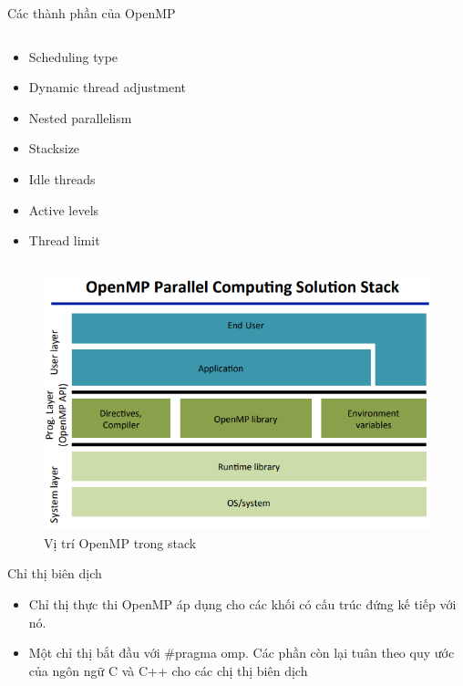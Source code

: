 \documentclass[10pt]{beamer}
\theoremstyle{remark}
\numberwithin{algocf}{section}
\numberwithin{equation}{section}
\numberwithin{dl}{section}
\numberwithin{figure}{section}
\begin{document}
\begin{frame}{Các thành phần của OpenMP}
\begin{columns}[onlytextwidth]
\begin{column}{0.3\textwidth}
\begin{itemize}
                \item Scheduling type
                \item Dynamic thread adjustment
                \item Nested parallelism
                \item Stacksize
                \item Idle threads
                \item Active levels
                \item Thread limit
            \end{itemize}
        \end{column}
    \end{columns}
\end{frame}

\begin{frame}
    \begin{figure}[H]
        \centering
        \includegraphics[width=0.9\linewidth]{figures/OpenMP/OpenMP_Parallel_Computing_Solution_Stack.png}
        \caption{Vị trí OpenMP trong stack}
    \end{figure}
\end{frame}

\begin{frame}{Chỉ thị biên dịch}
    \begin{itemize}
        \item Chỉ thị thực thi OpenMP áp dụng cho các khối có cấu trúc đứng kế tiếp với nó.
        \item Một chỉ thị bắt đầu với \#pragma omp. Các phần còn lại tuân theo quy ước của ngôn ngữ C và C++ cho các chị thị biên dịch 
    \end{itemize}
\end{frame}
\end{document}
